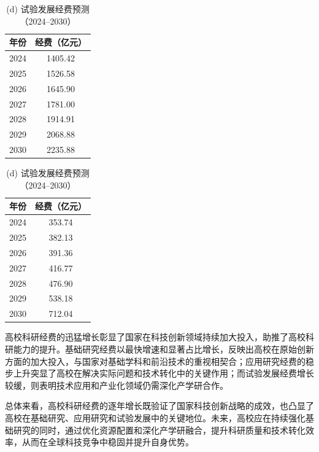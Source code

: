 \begin{table}[H]
  \begin{minipage}[t]{0.48\textwidth}
    \centering
    \caption*{(c) 应用研究经费预测（2024--2030）}
    \vspace{0.5em}
    \begin{tabular}{lc}
      \toprule
      年份 & 经费（亿元） \\
      \midrule
      2024 & 1405.42 \\
      2025 & 1526.58 \\
      2026 & 1645.90 \\
      2027 & 1781.00 \\
      2028 & 1914.91 \\
      2029 & 2068.88 \\
      2030 & 2235.88 \\
      \bottomrule
    \end{tabular}
  \end{minipage}
  \hfill
  \begin{minipage}[t]{0.48\textwidth}
    \centering
    \caption*{(d) 试验发展经费预测（2024--2030）}
    \vspace{0.5em}
    \begin{tabular}{lc}
      \toprule
      年份 & 经费（亿元） \\
      \midrule
      2024 & 353.74 \\
      2025 & 382.13 \\
      2026 & 391.36 \\
      2027 & 416.77 \\
      2028 & 476.90 \\
      2029 & 538.18 \\
      2030 & 712.04 \\
      \bottomrule
    \end{tabular}
  \end{minipage}
  
  \label{高校经费支出融合预测值（2024--2030）数据汇总}
\end{table}

高校科研经费的迅猛增长彰显了国家在科技创新领域持续加大投入，助推了高校科研能力的提升。基础研究经费以最快增速和显著占比增长，反映出高校在原始创新方面的加大投入，与国家对基础学科和前沿技术的重视相契合；应用研究经费的稳步上升突显了高校在解决实际问题和技术转化中的关键作用；而试验发展经费增长较缓，则表明技术应用和产业化领域仍需深化产学研合作。

总体来看，高校科研经费的逐年增长既验证了国家科技创新战略的成效，也凸显了高校在基础研究、应用研究和试验发展中的关键地位。未来，高校应在持续强化基础研究的同时，通过优化资源配置和深化产学研融合，提升科研质量和技术转化效率，从而在全球科技竞争中稳固并提升自身优势。
